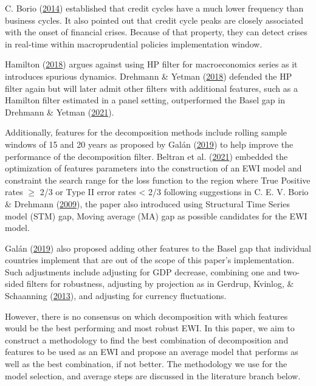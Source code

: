 \documentclass[
  12pt,
]{article}
\begin{document}
C. Borio (\protect\hyperlink{ref-borio_financial_2014}{2014}) established that credit cycles have a much lower frequency than business cycles. It also pointed out that credit cycle peaks are closely associated with the onset of financial crises. Because of that property, they can detect crises in real-time within macroprudential policies implementation window.

Hamilton (\protect\hyperlink{ref-hamilton_why_2018}{2018}) argues against using HP filter for macroeconomics series as it introduces spurious dynamics. Drehmann \& Yetman (\protect\hyperlink{ref-drehmann_why_2018}{2018}) defended the HP filter again but will later admit other filters with additional features, such as a Hamilton filter estimated in a panel setting, outperformed the Basel gap in Drehmann \& Yetman (\protect\hyperlink{ref-drehmann_which_2021}{2021}).

Additionally, features for the decomposition methods include rolling sample windows of 15 and 20 years as proposed by Galán (\protect\hyperlink{ref-galan_measuring_2019}{2019}) to help improve the performance of the decomposition filter. Beltran et al. (\protect\hyperlink{ref-beltran_optimizing_2021}{2021}) embedded the optimization of features parameters into the construction of an EWI model and constraint the search range for the loss function to the region where True Positive rates \(\ge\) 2/3 or Type II error rates \textless{} 2/3 following suggestions in C. E. V. Borio \& Drehmann (\protect\hyperlink{ref-borio_assessing_2009}{2009}), the paper also introduced using Structural Time Series model (STM) gap, Moving average (MA) gap as possible candidates for the EWI model.

Galán (\protect\hyperlink{ref-galan_measuring_2019}{2019}) also proposed adding other features to the Basel gap that individual countries implement that are out of the scope of this paper's implementation. Such adjustments include adjusting for GDP decrease, combining one and two-sided filters for robustness, adjusting by projection as in Gerdrup, Kvinlog, \& Schaanning (\protect\hyperlink{ref-gerdrup_key_2013}{2013}), and adjusting for currency fluctuations.

However, there is no consensus on which decomposition with which features would be the best performing and most robust EWI. In this paper, we aim to construct a methodology to find the best combination of decomposition and features to be used as an EWI and propose an average model that performs as well as the best combination, if not better. The methodology we use for the model selection, and average steps are discussed in the literature branch below.
\end{document}
